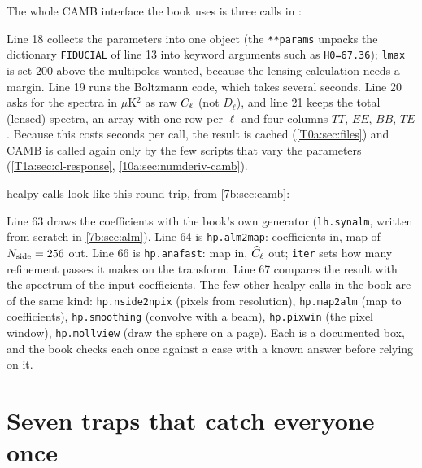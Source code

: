 The whole CAMB interface the book uses is three calls in :


Line 18 collects the parameters into one object (the \texttt{**params} unpacks the dictionary \texttt{FIDUCIAL} of line 13 into keyword arguments such as \texttt{H0=67.36}); \texttt{lmax} is set $200$ above the multipoles wanted, because the lensing calculation needs a margin. Line 19 runs the Boltzmann code, which takes several seconds. Line 20 asks for the spectra in $\mu$K$^2$ as raw $C_\ell$ (not $D_\ell$), and line 21 keeps the total (lensed) spectra, an array with one row per $\ell$ and four columns $TT$, $EE$, $BB$, $TE$. Because this costs seconds per call, the result is cached (\cref{T0a:sec:files}) and CAMB is called again only by the few scripts that vary the parameters (\cref{T1a:sec:cl-response}, \cref{10a:sec:numderiv-camb}).

healpy calls look like this round trip, from \cref{7b:sec:camb}:


Line 63 draws the coefficients with the book's own generator (\texttt{lh.synalm}, written from scratch in \cref{7b:sec:alm}). Line 64 is \texttt{hp.alm2map}: coefficients in, map of $N_{\rm side}=256$ out. Line 66 is \texttt{hp.anafast}: map in, $\widehat{C}_\ell$ out; \texttt{iter} sets how many refinement passes it makes on the transform. Line 67 compares the result with the spectrum of the input coefficients. The few other healpy calls in the book are of the same kind: \texttt{hp.nside2npix} (pixels from resolution), \texttt{hp.map2alm} (map to coefficients), \texttt{hp.smoothing} (convolve with a beam), \texttt{hp.pixwin} (the pixel window), \texttt{hp.mollview} (draw the sphere on a page). Each is a documented box, and the book checks each once against a case with a known answer before relying on it.
\providecommand{\TzoutPart}[2]{}

\section{Seven traps that catch everyone once}
\label{T0a:sec:pitfalls}

